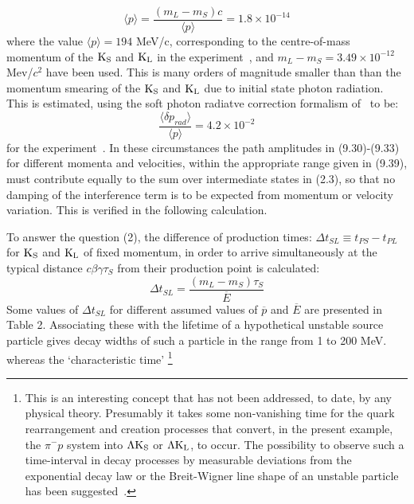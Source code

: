 \documentclass [12pt]{article}
\begin{document}
{\begin{equation}
     {\langle p \rangle} = \frac{(m_L -m_S)c}{\langle p \rangle} = 1.8 \times 10^{-14}
   \end{equation} 
    where the value $\langle p \rangle = 194$ MeV/c, corresponding to the centre-of-mass momentum 
   of the  ${\rm K_S}$ and ${\rm K_L}$ in the experiment~\cite{DSDQ},
    and $m_L-m_S = 3.49 \times 10^{-12}$ Mev/$c^2$ have been used.
       This is many orders of magnitude smaller than than the momentum smearing of the
     ${\rm K_S}$ and ${\rm K_L}$  due to initial state photon radiation. This is estimated, using the 
    soft photon radiatve correction formalism of~\cite{RK} to be:
   \begin{equation}
     \frac{\langle \delta p_{rad} \rangle}{\langle p \rangle} = 4.2 \times 10^{-2}
   \end{equation}
    for the experiment~\cite{DSDQ}.
    In these circumstances the path amplitudes in (9.30)-(9.33) for different momenta and velocities,
   within the appropriate range given in (9.39), must contribute equally to the 
    sum over intermediate states in (2.3), so that no damping of
   the interference term is to be expected from momentum or velocity variation. This is verified in the following
   calculation.
    \par To answer the question (2), the difference
    of production times: $\Delta t_{SL} \equiv t_{PS}- t_{PL}$  for ${\rm K_S}$ and ${\rm K_L}$ of fixed momentum,
     in order to arrive simultaneously at the typical distance $c \beta \gamma \tau_S$ from their production point is calculated:
     \begin{equation}
      \Delta t_{SL} = \frac{(m_L-m_S) \tau_S}{\overline{E}}
    \end{equation} 
     Some values of $\Delta t_{SL}$ for different assumed values of $\overline{p} $ and $\overline{E}$ are 
    presented in Table 2. Associating these with the lifetime of a hypothetical unstable source particle
    gives decay widths of such a particle in the range from 1 to 200 MeV. whereas the `characteristic time'
    \footnote{This is an interesting concept that has not been addressed, to date, by any physical theory.
     Presumably it takes some non-vanishing time for the quark rearrangement and creation processes
     that convert, in the present example, the $\pi^-p$ system into $\Lambda{\rm K_S}$ or  $\Lambda{\rm K_L}$,
     to occur. The possibility to observe such a time-interval in decay processes by measurable deviations from
    the exponential decay law or the Breit-Wigner line shape of an unstable particle has been suggested~\cite{DLR}.} 
}
\end{document}
